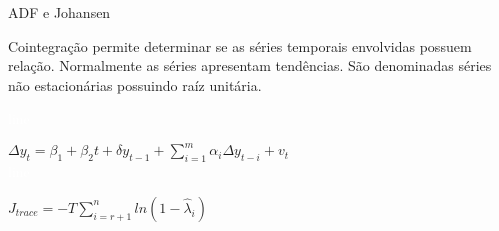 \begin{frame}{ADF \cite{dickey1979distribution} e Johansen \cite{johansen1988statistical}}
	\begin{block}{}
		Cointegração permite determinar se as séries temporais envolvidas possuem relação. 
		Normalmente as séries apresentam tendências. São denominadas séries não estacionárias possuindo raíz unitária.
	\end{block}
	
	\textcolor{white}{line}
	
	\centering
	$\Delta y_{t} = \beta_{1} + \beta_{2}t + \delta y_{t-1} + \sum_{i=1}^{m} \alpha_{i} \Delta y_{t-i} + v_t $\\
	
	\textcolor{white}{line}
	
	\centering
	$J_{trace} = -T \sum_{i=r+1}^{n} ln(1-\hat{\lambda}_{i})$
\end{frame}


